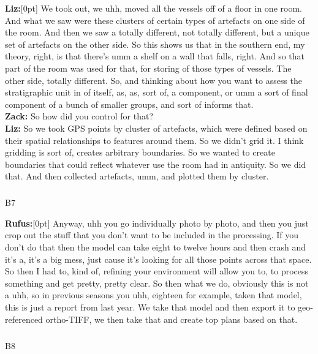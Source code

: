 \documentclass[
]{article}
\makeatletter
\let\oldsubparagraph\subparagraph
\renewcommand{\subparagraph}{
    \@ifstar
      \xxxSubParagraphStar
      \xxxSubParagraphNoStar
  }
\newcommand{\xxxSubParagraphStar}[1]{\oldsubparagraph*{#1}\mbox{}}
\newcommand{\xxxSubParagraphNoStar}[1]{\oldsubparagraph{#1}\mbox{}}
\newcommand{\paragraphnumber}[1]{\marginnote{\color{lightgray}\tiny{#1}}[0pt]}
\makeatother
\begin{document}
\textbf{Liz:}\paragraphnumber{[120]} We took out, we uhh, moved all the
vessels off of a floor in one room. And what we saw were these clusters
of certain types of artefacts on one side of the room. And then we saw a
totally different, not totally different, but a unique set of artefacts
on the other side. So this shows us that in the southern end, my theory,
right, is that there's umm a shelf on a wall that falls, right. And so
that part of the room was used for that, for storing of those types of
vessels. The other side, totally different. So, and thinking about how
you want to assess the stratigraphic unit in of itself, as, as, sort of,
a component, or umm a sort of final component of a bunch of smaller
groups, and sort of informs that.\\
\textbf{Zack:} So how did you control for that?\\
\textbf{Liz:} So we took GPS points by cluster of artefacts, which were
defined based on their spatial relationships to features around them. So
we didn't grid it. I think gridding is sort of, creates arbitrary
boundaries. So we wanted to create boundaries that could reflect
whatever use the room had in antiquity. So we did that. And then
collected artefacts, umm, and plotted them by cluster.

\subparagraph{B7}\label{sec-B7}

\textbf{Rufus:}\paragraphnumber{[121]} Anyway, uhh you go individually
photo by photo, and then you just crop out the stuff that you don't want
to be included in the processing. If you don't do that then the model
can take eight to twelve hours and then crash and it's a, it's a big
mess, just cause it's looking for all those points across that space. So
then I had to, kind of, refining your environment will allow you to, to
process something and get pretty, pretty clear. So then what we do,
obviously this is not a uhh, so in previous seasons you uhh, eighteen
for example, taken that model, this is just a report from last year. We
take that model and then export it to geo-referenced ortho-TIFF, we then
take that and create top plans based on that.

\subparagraph{B8}\label{sec-B8}
\end{document}
